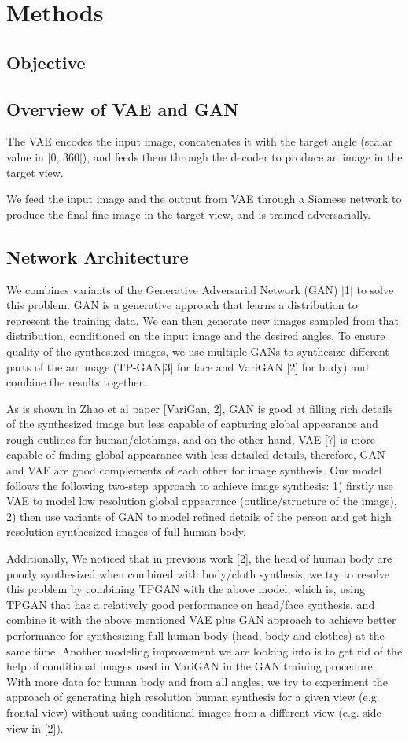 \documentclass[10pt,conference]{IEEEtran}
\begin{document}
\section{Methods}
\subsection{Objective}


\subsection{Overview of VAE and GAN}
The VAE encodes the input image, concatenates it with
the target angle (scalar value in [0, 360]), and feeds them
through the decoder to produce an image in the target view.

We feed the input image and the output from VAE
through a Siamese network to produce the final fine image
in the target view, and is trained adversarially.

\subsection{Network Architecture}
We combines variants of the Generative Adversarial Network (GAN) [1] to solve this problem. GAN is a generative approach that learns a distribution to represent the training data. We can then generate new images sampled from that distribution, conditioned on the input image and the desired angles. To ensure quality of the synthesized images, we use multiple GANs to synthesize different parts of the an image (TP-GAN[3] for face and VariGAN [2] for body) and combine the results together.

As is shown in Zhao et al paper [VariGan, 2], GAN is good at filling rich details of the synthesized image but less capable of capturing global appearance and rough outlines for human/clothings, and on the other hand, VAE [7] is more capable of finding global appearance with less detailed details, therefore, GAN and VAE are good complements of each other for image synthesis. Our model follows the following two-step approach to achieve image synthesis: 1) firstly use VAE to model low resolution global appearance (outline/structure of the image), 2) then use variants of GAN to model refined details of the person and get high resolution synthesized images of full human body. 

Additionally, We noticed that in previous work [2], the head of human body are poorly synthesized when combined with body/cloth synthesis, we try to resolve this problem by combining TPGAN with the above model, which is, using TPGAN that has a relatively good performance on head/face synthesis, and combine it with the above mentioned VAE plus GAN approach to achieve better performance for synthesizing full human body (head, body and clothes) at the same time. Another modeling improvement we are looking into is to get rid of the help of conditional images used in VariGAN in the GAN training procedure. With more data for human body and from all angles, we try to experiment the approach of generating high resolution human synthesis for a given view (e.g. frontal view) without using conditional images from a different view (e.g. side view in [2]).
\end{document}
